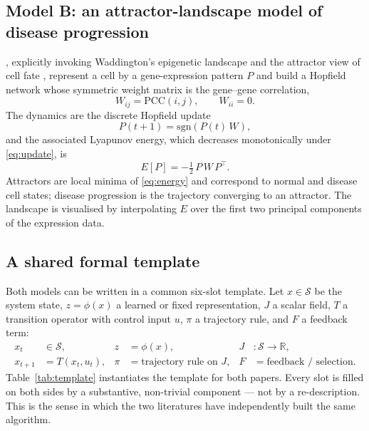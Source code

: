 \documentclass[11pt]{article}
\begin{document}
\subsection{Model B: an attractor-landscape model of disease progression}
\citet{fard2017attractor}, explicitly invoking Waddington's epigenetic landscape \citep{waddington1957strategy} and the
attractor view of cell fate \citep{huang2005cellfates,huang2009cancer}, represent a cell by a gene-expression pattern
$P$ and build a Hopfield network \citep{hopfield1982neural} whose symmetric weight matrix is the gene--gene
correlation,
\begin{equation}
W_{ij} = \mathrm{PCC}(i,j), \qquad W_{ii}=0 .
\label{eq:W}
\end{equation}
The dynamics are the discrete Hopfield update
\begin{equation}
P(t+1) = \mathrm{sgn}\!\left(P(t)\,W\right),
\label{eq:update}
\end{equation}
and the associated Lyapunov energy, which decreases monotonically under \eqref{eq:update}, is
\begin{equation}
E[P] = -\tfrac{1}{2}\,P\,W\,P^{\top}.
\label{eq:energy}
\end{equation}
Attractors are local minima of \eqref{eq:energy} and correspond to normal and disease cell states; disease
progression is the trajectory converging to an attractor. The landscape is visualised by interpolating $E$ over the
first two principal components of the expression data.

\subsection{A shared formal template}

Both models can be written in a common six-slot template. Let $x\in\mathcal{S}$ be the system state, $z=\phi(x)$ a
learned or fixed representation, $J$ a scalar field, $T$ a transition operator with control input $u$, $\pi$ a
trajectory rule, and $F$ a feedback term:
\begin{align}
x_t &\in \mathcal{S}, &
z &= \phi(x), &
J&:\mathcal{S}\rightarrow\mathbb{R}, \label{eq:tmpl1}\\
x_{t+1} &= T(x_t,u_t), &
\pi &= \text{trajectory rule on } J, &
F &= \text{feedback / selection}. \label{eq:tmpl2}
\end{align}
Table~\ref{tab:template} instantiates the template for both papers. Every slot is filled on both sides by a
substantive, non-trivial component --- not by a re-description. This is the sense in which the two literatures have
independently built the same algorithm.
\end{document}
